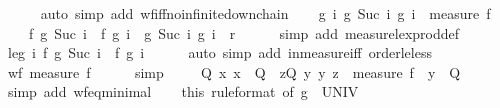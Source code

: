 \begin{isabellebody}
\ \ \ \ \isamarkupfalse%
\ {\isacharparenleft}auto\ simp\ add{\isacharcolon}\ wf{\isacharunderscore}iff{\isacharunderscore}no{\isacharunderscore}infinite{\isacharunderscore}down{\isacharunderscore}chain{\isacharparenright}\isanewline
\ \ \isamarkupfalse%
\ g{\isacharcolon}\ {\isachardoublequoteopen}{\isasymforall}i{\isachardot}\ {\isacharparenleft}g\ {\isacharparenleft}Suc\ i{\isacharparenright}{\isacharcomma}\ g\ i{\isacharparenright}\ {\isasymin}\ measure\ f\ {\isasymor}\isanewline
\ \ \ \ f\ {\isacharparenleft}g\ {\isacharparenleft}Suc\ i{\isacharparenright}{\isacharparenright}\ {\isacharequal}\ f\ {\isacharparenleft}g\ i{\isacharparenright}\ {\isasymand}\ {\isacharparenleft}g\ {\isacharparenleft}Suc\ i{\isacharparenright}{\isacharcomma}\ g\ i{\isacharparenright}\ {\isasymin}\ r{\isachardoublequoteclose}\isanewline
\ \ \ \ \isamarkupfalse%
\ {\isacharparenleft}simp\ add{\isacharcolon}\ measure{\isacharunderscore}lex{\isacharunderscore}prod{\isacharunderscore}def{\isacharprime}{\isacharparenright}\isanewline
\ \ \isamarkupfalse%
\ le{\isacharunderscore}g{\isacharcolon}\ {\isachardoublequoteopen}{\isasymforall}i{\isachardot}\ f\ {\isacharparenleft}g\ {\isacharparenleft}Suc\ i{\isacharparenright}{\isacharparenright}\ {\isasymle}\ f\ {\isacharparenleft}g\ i{\isacharparenright}{\isachardoublequoteclose}\isanewline
\ \ \ \ \isamarkupfalse%
\ {\isacharparenleft}auto\ simp\ add{\isacharcolon}\ in{\isacharunderscore}measure{\isacharunderscore}iff\ order{\isacharunderscore}le{\isacharunderscore}less{\isacharparenright}\isanewline
\ \ \isamarkupfalse%
\ {\isachardoublequoteopen}wf\ {\isacharparenleft}measure\ f{\isacharparenright}{\isachardoublequoteclose}\isanewline
\ \ \ \ \isamarkupfalse%
\ simp\isanewline
\ \ \isamarkupfalse%
\ {\isachardoublequoteopen}\ {\isasymforall}Q{\isachardot}\ {\isacharparenleft}{\isasymexists}x{\isachardot}\ x\ {\isasymin}\ Q{\isacharparenright}\ {\isasymlongrightarrow}\ {\isacharparenleft}{\isasymexists}z{\isasymin}Q{\isachardot}\ {\isasymforall}y{\isachardot}\ {\isacharparenleft}y{\isacharcomma}\ z{\isacharparenright}\ {\isasymin}\ measure\ f\ {\isasymlongrightarrow}\ y\ {\isasymnotin}\ Q{\isacharparenright}{\isachardoublequoteclose}\isanewline
\ \ \ \ \isamarkupfalse%
\ {\isacharparenleft}simp\ add{\isacharcolon}\ wf{\isacharunderscore}eq{\isacharunderscore}minimal{\isacharparenright}\isanewline
\ \ \isamarkupfalse%
\ this\ {\isacharbrackleft}rule{\isacharunderscore}format{\isacharcomma}\ of\ {\isachardoublequoteopen}g\ {\isacharbackquote}\ UNIV{\isachardoublequoteclose}{\isacharbrackright}\isanewline

\end{isabellebody}
